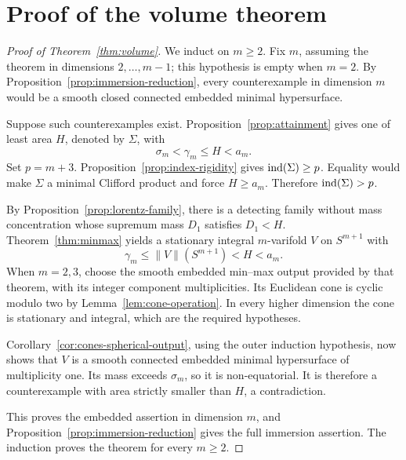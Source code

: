\section{Proof of the volume theorem}
\label{sec:conclusion}

\begin{proof}[Proof of Theorem~\ref{thm:volume}]
We induct on \(m\ge2\). Fix \(m\), assuming the theorem in dimensions
\(2,\ldots,m-1\); this hypothesis is empty when \(m=2\).
By Proposition~\ref{prop:immersion-reduction}, every counterexample in
dimension \(m\) would be a smooth closed connected embedded minimal
hypersurface.

Suppose such counterexamples exist. Proposition~\ref{prop:attainment}
gives one of least area \(H\), denoted by \(\Sigma\), with
\[
\sigma_m<\gamma_m\le H<a_m.
\]
Set \(p=m+3\). Proposition~\ref{prop:index-rigidity} gives
\(\operatorname{ind}(\Sigma)\ge p\). Equality would make \(\Sigma\) a minimal
Clifford product and force \(H\ge a_m\). Therefore
\(\operatorname{ind}(\Sigma)>p\).

By Proposition~\ref{prop:lorentz-family}, there is a detecting family
without mass concentration whose supremum mass \(D_1\) satisfies
\(D_1<H\). Theorem~\ref{thm:minmax} yields a stationary integral
\(m\)-varifold \(V\) on
\(S^{m+1}\) with
\[
\gamma_m\le\|V\|(S^{m+1})<H<a_m.
\]
When \(m=2,3\), choose the smooth embedded min--max output provided by
that theorem, with its integer component multiplicities. Its
Euclidean cone is cyclic modulo two by
Lemma~\ref{lem:cone-operation}. In every higher dimension the cone is
stationary and integral, which are the required hypotheses.

Corollary~\ref{cor:cones-spherical-output}, using the outer induction
hypothesis, now shows that \(V\) is a smooth connected embedded minimal
hypersurface of multiplicity one. Its mass exceeds \(\sigma_m\), so it
is non-equatorial. It is therefore a counterexample with area strictly
smaller than \(H\), a contradiction.

This proves the embedded assertion in dimension \(m\), and
Proposition~\ref{prop:immersion-reduction} gives the full immersion
assertion. The induction proves the theorem for every \(m\ge2\).
\end{proof}
